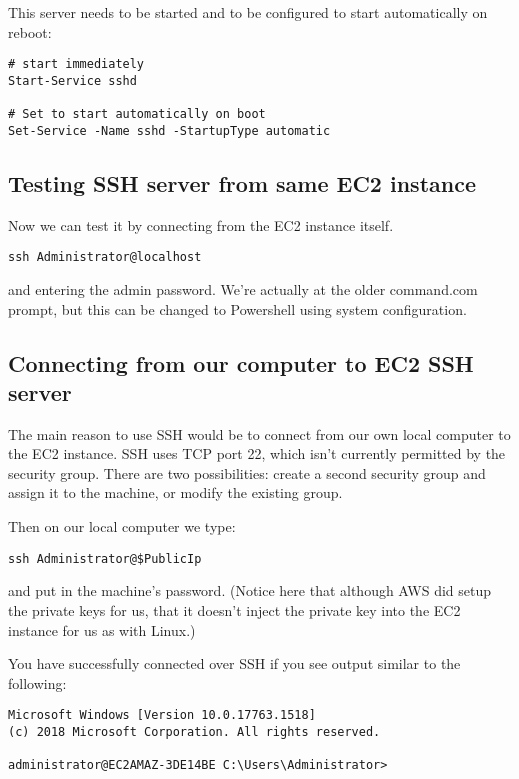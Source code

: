 This server needs to be started and to be configured to start
automatically on reboot:

\begin{verbatim}
# start immediately
Start-Service sshd

# Set to start automatically on boot
Set-Service -Name sshd -StartupType automatic
\end{verbatim}

\subsection{Testing SSH server from same EC2
instance}\label{testing-ssh-server-from-same-ec2-instance}

Now we can test it by connecting from the EC2 instance itself.

\begin{verbatim}
ssh Administrator@localhost
\end{verbatim}

and entering the admin password. We're actually at the older command.com
prompt, but this can be changed to Powershell using system
configuration.

\subsection{Connecting from our computer to EC2 SSH
server}\label{connecting-from-our-computer-to-ec2-ssh-server}

The main reason to use SSH would be to connect from our own local
computer to the EC2 instance. SSH uses TCP port 22, which isn't
currently permitted by the security group. There are two possibilities:
create a second security group and assign it to the machine, or modify
the existing group.


Then on our local computer we type:

\begin{verbatim}
ssh Administrator@$PublicIp
\end{verbatim}

and put in the machine's password. (Notice here that although AWS did
setup the private keys for us, that it doesn't inject the private key
into the EC2 instance for us as with Linux.)

You have successfully connected over SSH if you see output similar to
the following:

\begin{verbatim}
Microsoft Windows [Version 10.0.17763.1518]
(c) 2018 Microsoft Corporation. All rights reserved.

administrator@EC2AMAZ-3DE14BE C:\Users\Administrator>
\end{verbatim}

